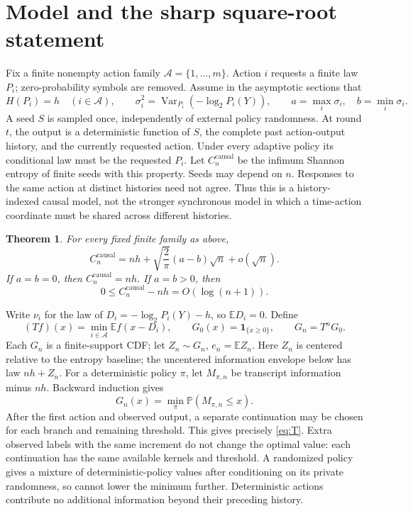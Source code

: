 \documentclass[11pt,a4paper]{article}
\newtheorem{theorem}{Theorem}
\newcommand{\E}{\mathbb E}
\newcommand{\Prob}{\mathbb P}
\newcommand{\causal}{\mathrm{causal}}
\begin{document}
\section{Model and the sharp square-root statement}\label{sec:model}
Fix a finite nonempty action family $\mathcal A=\{1,\ldots,m\}$.
Action $i$ requests a finite law $P_i$; zero-probability symbols are
removed. Assume in the asymptotic sections that
\[
H(P_i)=h\quad(i\in\mathcal A),\qquad
\sigma_i^2=\operatorname{Var}_{P_i}(-\log_2P_i(Y)),\qquad
a=\max_i\sigma_i,\quad b=\min_i\sigma_i.
\]
A seed $S$ is sampled once, independently of external policy randomness.
At round $t$, the output is a deterministic function of $S$, the complete
past action-output history, and the currently requested action.
Under every adaptive policy its conditional law must be the requested
$P_i$. Let $C_n^{\causal}$ be the infimum Shannon entropy of finite seeds
with this property. Seeds may depend on $n$. Responses to the same action
at distinct histories need not agree. Thus this is a history-indexed
causal model, not the stronger synchronous model in which a time-action
coordinate must be shared across different histories.

\begin{theorem}\label{thm:main}
For every fixed finite family as above,
\begin{equation}\label{eq:main}
\boxed{C_n^{\causal}
=nh+\sqrt{\frac2\pi}(a-b)\sqrt n+o(\sqrt n).}
\end{equation}
If $a=b=0$, then $C_n^{\causal}=nh$. If $a=b>0$, then
\begin{equation}\label{eq:equalvar}
0\le C_n^{\causal}-nh=O(\log(n+1)).
\end{equation}
\end{theorem}
Write $\nu_i$ for the law of $D_i=-\log_2P_i(Y)-h$, so $\E D_i=0$.
Define
\begin{equation}\label{eq:T}
(Tf)(x)=\min_{i\in\mathcal A}\E f(x-D_i),\qquad
G_0(x)=\mathbf1_{\{x\ge0\}},\qquad G_n=T^nG_0.
\end{equation}
Each $G_n$ is a finite-support CDF; let $Z_n\sim G_n$, $e_n=\E Z_n$.
Here $Z_n$ is centered relative to the entropy baseline; the uncentered
information envelope below has law $nh+Z_n$.
For a deterministic policy $\pi$, let $M_{\pi,n}$ be transcript
information minus $nh$. Backward induction gives
\begin{equation}\label{eq:policy}
G_n(x)=\min_\pi\Prob(M_{\pi,n}\le x).
\end{equation}
After the first action and observed output, a separate continuation may
be chosen for each branch and remaining threshold. This gives precisely
\eqref{eq:T}. Extra observed labels with the same increment do not change
the optimal value: each continuation has the same available kernels and
threshold. A randomized policy gives a mixture of deterministic-policy
values after conditioning on its private randomness, so cannot lower
the minimum further. Deterministic actions contribute no additional
information beyond their preceding history.
\end{document}
